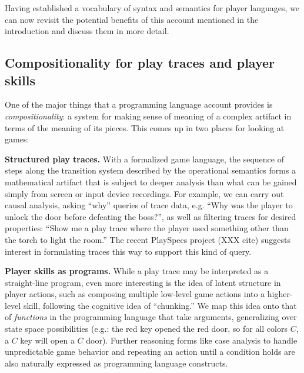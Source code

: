 
Having established a vocabulary of syntax and semantics for player
languages, we can now revisit the potential benefits of this account
mentioned in the introduction and discuss them in more detail.

\subsection{Compositionality for play traces and player skills}

One of the major things that a programming language account provides is
{\em compositionality}: a system for making sense of meaning of a complex
artifact in terms of the meaning of its pieces. This comes up in two places
for looking at games:

{\bf Structured play traces.} With a formalized game language, the sequence
of steps along the transition system described by the operational semantics
forms a mathematical artifact that is subject to deeper analysis than what
can be gained simply from screen or input device recordings. For example,
we can carry out causal analysis, asking ``why'' queries of trace data,
e.g. ``Why was the player to unlock the door before defeating the boss?'',
as well as filtering traces for desired properties: ``Show me a play trace
where the player used something other than the torch to light the room.''
The recent PlaySpecs project (XXX cite) suggests interest in formulating
traces this way to support this kind of query.

{\bf Player skills as programs.} While a play trace may be interpreted as a
straight-line program, even more interesting is the idea of latent
structure in player actions, such as composing multiple low-level game
actions into a higher-level skill, following the cognitive idea of
``chunking.'' We map this idea onto that of {\em functions} in the
programming language that take arguments, generalizing over state space
possibilities (e.g.: the red key opened the red door, so for all colors
$C$, a $C$ key will open a $C$ door). Further reasoning forms like case
analysis to handle unpredictable game behavior and repeating an action
until a condition holds are also naturally expressed as programming
language constructs.


